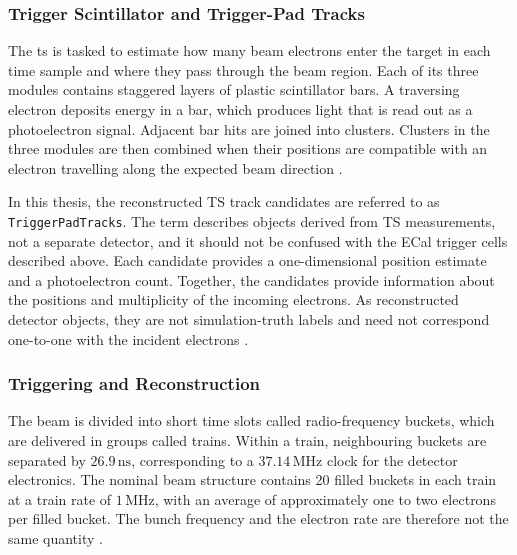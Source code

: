 \subsubsection{Trigger Scintillator and Trigger-Pad Tracks}

The \gls{ts} is tasked to estimate how many beam electrons enter the target in each
time sample and where they pass through the beam region. Each of its three
modules contains staggered layers of plastic scintillator bars. A traversing
electron deposits energy in a bar, which produces light that is read out as
a photoelectron signal. Adjacent bar hits are joined into clusters. Clusters
in the three modules are then combined when their positions are compatible
with an electron travelling along the expected beam direction
\cite{ldmx2025-overview}.

In this thesis, the reconstructed TS track candidates are referred to as
\texttt{TriggerPadTracks}. The term describes objects derived from TS
measurements, not a separate detector, and it should not be confused with the
ECal trigger cells described above. Each candidate provides a
one-dimensional position estimate and a photoelectron count. Together, the
candidates provide information about the positions and multiplicity of the
incoming electrons. As reconstructed detector objects, they are not
simulation-truth labels and need not correspond one-to-one with the incident
electrons \cite{ldmx2025-overview}.

\subsubsection{Triggering and Reconstruction}

The beam is divided into short time slots called radio-frequency buckets,
which are delivered in groups called trains. Within a train, neighbouring
buckets are separated by \(26.9\,\mathrm{ns}\), corresponding to a
\(37.14\,\mathrm{MHz}\) clock for the detector electronics. The nominal beam
structure contains 20 filled buckets in each train at a train rate of
\(1\,\mathrm{MHz}\), with an average of approximately one to two electrons
per filled bucket. The bunch frequency and the electron rate are therefore
not the same quantity \cite{ldmx2025-overview}.

